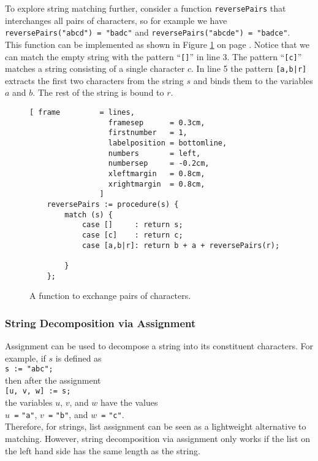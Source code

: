 To explore string matching further, consider a function \texttt{reversePairs} that interchanges all pairs
of characters, so for example we have
\\[0.2cm]
\hspace*{1.3cm}
\texttt{reversePairs("abcd") = "badc"} \quad and \quad
\texttt{reversePairs("abcde") = "badce"}. 
\\[0.2cm]
This function can be implemented as shown in Figure \ref{fig:reverse-pairs.stlx} on page
\pageref{fig:reverse-pairs.stlx}.  Notice that we can match the empty string with the pattern
``\texttt{[]}'' in line 3.  The pattern ``\texttt{[c]}'' matches a string consisting of a single
character $c$.  In line 5 the pattern \texttt{[a,b|r]} extracts the first two
characters from the string $s$ and binds them to the variables $a$ and $b$.  The rest of the string is
bound to $r$.

\begin{figure}[!ht]
\centering
\begin{Verbatim}[ frame         = lines, 
                  framesep      = 0.3cm, 
                  firstnumber   = 1,
                  labelposition = bottomline,
                  numbers       = left,
                  numbersep     = -0.2cm,
                  xleftmargin   = 0.8cm,
                  xrightmargin  = 0.8cm,
                ]
    reversePairs := procedure(s) {
        match (s) {
            case []     : return s;
            case [c]    : return c;
            case [a,b|r]: return b + a + reversePairs(r);
    
        }
    };
\end{Verbatim}
\vspace*{-0.3cm}
\caption{A function to exchange pairs of characters.}
\label{fig:reverse-pairs.stlx}
\end{figure}

\subsubsection{String Decomposition via Assignment}
Assignment can be used to decompose a string into its constituent characters.  For
example, if $s$ is defined as
\\[0.2cm]
\hspace*{1.3cm}
\texttt{s := }\verb|"abc";|
\\[0.2cm]
then after the assignment
\\[0.2cm]
\hspace*{1.3cm}
\texttt{[u, v, w] := s;}
\\[0.2cm]
the variables $u$, $v$, and $w$ have the values
\\[0.2cm]
\hspace*{1.3cm}
\texttt{$u$ =} \verb|"a"|, \quad
\texttt{$v$ =} \verb|"b"|, \quad and \quad
\texttt{$w$ =} \verb|"c"|. 
\\[0.2cm]
Therefore, for strings, list assignment can be seen as a lightweight alternative to matching.
However, string decomposition via assignment only works if the list on the left hand side has the
same length as the string.

